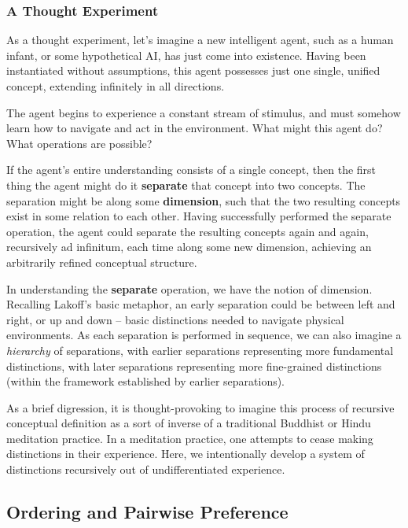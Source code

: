 \subsubsection{A Thought Experiment}

As a thought experiment, let's imagine a new intelligent agent, such as a human infant, or some hypothetical AI, has just come into existence.
Having been instantiated without assumptions, this agent possesses just one single, unified concept, extending infinitely in all directions.

The agent begins to experience a constant stream of stimulus, and must somehow learn how to navigate and act in the environment. What might this agent do? What operations are possible?

If the agent's entire understanding consists of a single concept, then the first thing the agent might do it \textbf{separate} that concept into two concepts.
The separation might be along some \textbf{dimension}, such that the two resulting concepts exist in some relation to each other.
Having successfully performed the separate operation, the agent could separate the resulting concepts again and again, recursively ad infinitum, each time along some new dimension, achieving an arbitrarily refined conceptual structure.

In understanding the \textbf{separate} operation, we have the notion of dimension.
Recalling Lakoff's basic metaphor, an early separation could be between left and right, or up and down -- basic distinctions needed to navigate physical environments.
As each separation is performed in sequence, we can also imagine a \textit{hierarchy} of separations, with earlier separations representing more fundamental distinctions, with later separations representing more fine-grained distinctions (within the framework established by earlier separations).

As a brief digression, it is thought-provoking to imagine this process of recursive conceptual definition as a sort of inverse of a traditional Buddhist or Hindu meditation practice.
In a meditation practice, one attempts to cease making distinctions in their experience. Here, we intentionally develop a system of distinctions recursively out of undifferentiated experience.


\subsection{Ordering and Pairwise Preference}

